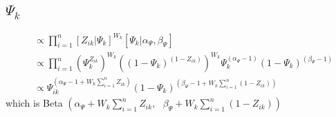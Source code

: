\documentclass[fleqn]{article}
\begin{document}
\subsection{$\Psi_k$}
%
\begin{align*}
   [\Psi_k | \cdot] & \propto \prod_{i = 1}^n [Z_{ik} | \Psi_k]^{W_k} [\Psi_k | \alpha_\Psi, \beta_\Psi]\\
   & \propto \prod_{i = 1}^n (\Psi_{k}^{Z_{ik}})^{W_k} \left( (1 - \Psi_k)^{(1 - Z_{ik})} \right)^{W_k} \Psi_k^{(\alpha_\Psi - 1)} (1 - \Psi_k)^{(\beta_\Psi - 1)}\\
  & \propto \Psi_{ik}^{(\alpha_\Psi - 1 + W_k \sum_{i = 1}^n Z_{ik})} (1 - \Psi_k)^{(\beta_\Psi - 1 + W_k \sum_{i = 1}^n (1 - Z_{ik}))}
\end{align*}
which is Beta $\left( \alpha_\Psi + W_k \sum_{i = 1}^n Z_{ik}, \mbox{ } \beta_\Psi + W_k \sum_{i = 1}^n (1 - Z_{ik}) \right)$\\
\\
%
%
\end{document}
